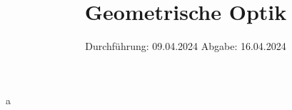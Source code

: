 

\subject{V408}
\title{Geometrische Optik}
\date{%
  Durchführung: 09.04.2024
  \hspace{3em}
  Abgabe: 16.04.2024
}



\maketitle
\thispagestyle{empty}
\tableofcontents
\newpage
a






\printbibliography{}



